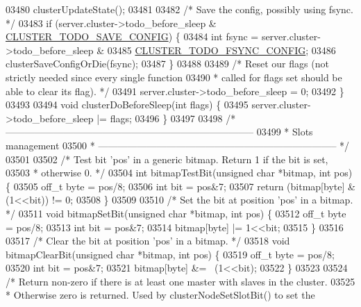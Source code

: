 \begin{DoxyCode}
{{{{{{{{{{{{{{{{{{{{{{{{{{{{{{{{{{{{{{{{{{{{{{{{{{{{{{{{{{{{{03480         clusterUpdateState();
03481 
03482     \textcolor{comment}{/* Save the config, possibly using fsync. */}
03483     \textcolor{keywordflow}{if} (server.cluster->todo\_before\_sleep & \hyperlink{cluster_8h_a0ae5ff08fbae3c655012b4de8bfc327d}{CLUSTER\_TODO\_SAVE\_CONFIG}) \{
03484         \textcolor{keywordtype}{int} fsync = server.cluster->todo\_before\_sleep &
03485                     \hyperlink{cluster_8h_accc9a00230cd04789db2398bb3ab715a}{CLUSTER\_TODO\_FSYNC\_CONFIG};
03486         clusterSaveConfigOrDie(fsync);
03487     \}
03488 
03489     \textcolor{comment}{/* Reset our flags (not strictly needed since every single function}
03490 \textcolor{comment}{     * called for flags set should be able to clear its flag). */}
03491     server.cluster->todo\_before\_sleep = 0;
03492 \}
03493 
03494 \textcolor{keywordtype}{void} clusterDoBeforeSleep(\textcolor{keywordtype}{int} flags) \{
03495     server.cluster->todo\_before\_sleep |= flags;
03496 \}
03497 
03498 \textcolor{comment}{/* -----------------------------------------------------------------------------}
03499 \textcolor{comment}{ * Slots management}
03500 \textcolor{comment}{ * -------------------------------------------------------------------------- */}
03501 
03502 \textcolor{comment}{/* Test bit 'pos' in a generic bitmap. Return 1 if the bit is set,}
03503 \textcolor{comment}{ * otherwise 0. */}
03504 \textcolor{keywordtype}{int} bitmapTestBit(\textcolor{keywordtype}{unsigned} \textcolor{keywordtype}{char} *bitmap, \textcolor{keywordtype}{int} pos) \{
03505     off\_t byte = pos/8;
03506     \textcolor{keywordtype}{int} bit = pos&7;
03507     \textcolor{keywordflow}{return} (bitmap[byte] & (1<<bit)) != 0;
03508 \}
03509 
03510 \textcolor{comment}{/* Set the bit at position 'pos' in a bitmap. */}
03511 \textcolor{keywordtype}{void} bitmapSetBit(\textcolor{keywordtype}{unsigned} \textcolor{keywordtype}{char} *bitmap, \textcolor{keywordtype}{int} pos) \{
03512     off\_t byte = pos/8;
03513     \textcolor{keywordtype}{int} bit = pos&7;
03514     bitmap[byte] |= 1<<bit;
03515 \}
03516 
03517 \textcolor{comment}{/* Clear the bit at position 'pos' in a bitmap. */}
03518 \textcolor{keywordtype}{void} bitmapClearBit(\textcolor{keywordtype}{unsigned} \textcolor{keywordtype}{char} *bitmap, \textcolor{keywordtype}{int} pos) \{
03519     off\_t byte = pos/8;
03520     \textcolor{keywordtype}{int} bit = pos&7;
03521     bitmap[byte] &= ~(1<<bit);
03522 \}
03523 
03524 \textcolor{comment}{/* Return non-zero if there is at least one master with slaves in the cluster.}
03525 \textcolor{comment}{ * Otherwise zero is returned. Used by clusterNodeSetSlotBit() to set the}
}}}}}}}}}}}}}}}}}}}}}}}}}}}}}}}}}}}}}}}}}}}}}}}}}}}}}}}}}}}}}
\end{DoxyCode}

